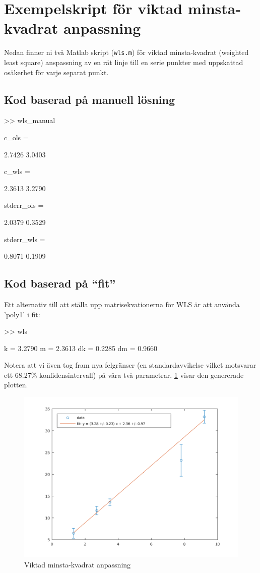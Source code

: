 \section{Exempelskript för viktad minsta-kvadrat anpassning}
\label{sec:matlab-wls}
Nedan finner ni två Matlab skript ({\tt wls.m}) för viktad minsta-kvadrat 
(weighted least square) anspassning av en rät linje till en serie punkter med
uppskattad osäkerhet för varje separat punkt.

\subsection{Kod baserad på manuell lösning}


\begin{terminaloutput}
>> wls_manual


c_ols =

    2.7426
    3.0403


c_wls =

    2.3613
    3.2790


stderr_ols =

    2.0379
    0.3529


stderr_wls =

    0.8071
    0.1909

\end{terminaloutput}


\subsection{Kod baserad på ``fit''}
Ett alternativ till att ställa upp matrisekvationerna för WLS
är att använda 'poly1' i fit:


\begin{terminaloutput}
>> wls

k = 3.2790
m =  2.3613
dk = 0.2285
dm = 0.9660
\end{terminaloutput}

Notera att vi även tog fram nya felgränser (en standardavvikelse vilket
motsvarar ett 68.27\% konfidensintervall) på våra två
parametrar. \cref{fig:matlab-wls} visar den genererade plotten.

\begin{figure}
  \centering
  \includegraphics[scale=0.5]{matlab/wls_fit.png}
  \caption{Viktad minsta-kvadrat anpassning}
  \label{fig:matlab-wls}
\end{figure}

